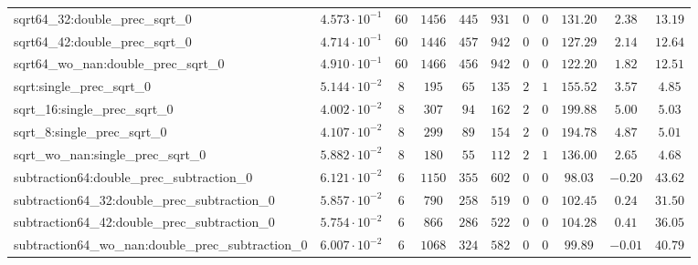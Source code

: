 \begin{tabular}{|l|c|c|c|c|c|c|c|c|c|c|}
sqrt64\_32:double\_prec\_sqrt\_0                          & $ 4.573 \cdot 10^{-1} $ & $ 60     $ & $ 1456   $ & $ 445   $ & $ 931   $ & $ 0   $ & $ 0 $ & $ 131.20      $ & $ 2.38    $ & $ 13.19   $ \\
sqrt64\_42:double\_prec\_sqrt\_0                          & $ 4.714 \cdot 10^{-1} $ & $ 60     $ & $ 1446   $ & $ 457   $ & $ 942   $ & $ 0   $ & $ 0 $ & $ 127.29      $ & $ 2.14    $ & $ 12.64   $ \\
sqrt64\_wo\_nan:double\_prec\_sqrt\_0                     & $ 4.910 \cdot 10^{-1} $ & $ 60     $ & $ 1466   $ & $ 456   $ & $ 942   $ & $ 0   $ & $ 0 $ & $ 122.20      $ & $ 1.82    $ & $ 12.51   $ \\
sqrt:single\_prec\_sqrt\_0                                & $ 5.144 \cdot 10^{-2} $ & $ 8      $ & $ 195    $ & $ 65    $ & $ 135   $ & $ 2   $ & $ 1 $ & $ 155.52      $ & $ 3.57    $ & $ 4.85    $ \\
sqrt\_16:single\_prec\_sqrt\_0                            & $ 4.002 \cdot 10^{-2} $ & $ 8      $ & $ 307    $ & $ 94    $ & $ 162   $ & $ 2   $ & $ 0 $ & $ 199.88      $ & $ 5.00    $ & $ 5.03    $ \\
sqrt\_8:single\_prec\_sqrt\_0                             & $ 4.107 \cdot 10^{-2} $ & $ 8      $ & $ 299    $ & $ 89    $ & $ 154   $ & $ 2   $ & $ 0 $ & $ 194.78      $ & $ 4.87    $ & $ 5.01    $ \\
sqrt\_wo\_nan:single\_prec\_sqrt\_0                       & $ 5.882 \cdot 10^{-2} $ & $ 8      $ & $ 180    $ & $ 55    $ & $ 112   $ & $ 2   $ & $ 1 $ & $ 136.00      $ & $ 2.65    $ & $ 4.68    $ \\
subtraction64:double\_prec\_subtraction\_0                & $ 6.121 \cdot 10^{-2} $ & $ 6      $ & $ 1150   $ & $ 355   $ & $ 602   $ & $ 0   $ & $ 0 $ & $ 98.03       $ & $ -0.20   $ & $ 43.62   $ \\
subtraction64\_32:double\_prec\_subtraction\_0            & $ 5.857 \cdot 10^{-2} $ & $ 6      $ & $ 790    $ & $ 258   $ & $ 519   $ & $ 0   $ & $ 0 $ & $ 102.45      $ & $ 0.24    $ & $ 31.50   $ \\
subtraction64\_42:double\_prec\_subtraction\_0            & $ 5.754 \cdot 10^{-2} $ & $ 6      $ & $ 866    $ & $ 286   $ & $ 522   $ & $ 0   $ & $ 0 $ & $ 104.28      $ & $ 0.41    $ & $ 36.05   $ \\
subtraction64\_wo\_nan:double\_prec\_subtraction\_0       & $ 6.007 \cdot 10^{-2} $ & $ 6      $ & $ 1068   $ & $ 324   $ & $ 582   $ & $ 0   $ & $ 0 $ & $ 99.89       $ & $ -0.01   $ & $ 40.79   $ \\

\end{tabular}
